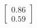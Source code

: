 \documentclass[preview]{standalone}
\begin{document}
\begin{align*}
\begin{bmatrix} 0.86 \\ 0.59 \end{bmatrix}
\end{align*}
\end{document}
